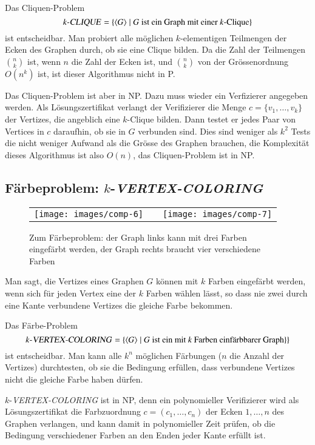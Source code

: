 Das Cliquen-Problem
\[
\text{$k$-\textsl{CLIQUE}} = \{ \langle G\rangle\;|\;
\text{$G$ ist ein Graph mit einer $k$-Clique}\}
\]
ist entscheidbar.
Man probiert alle möglichen $k$-elementigen
Teilmengen der Ecken des Graphen durch, ob sie eine Clique
bilden.
Da die Zahl der Teilmengen $\binom{n}{k}$ ist, wenn $n$
die Zahl der Ecken ist, und $\binom{n}{k}$ von der Grössenordnung
$O(n^k)$ ist, ist dieser Algorithmus nicht in P.

Das Cliquen-Problem ist aber in NP.
Dazu muss wieder ein Verfizierer angegeben werden.
Als Lösungszertifikat verlangt
der Verifizierer die Menge $c=\{v_1,\dots,v_k\}$ der
Vertizes, die angeblich eine $k$-Clique bilden.
Dann testet er jedes Paar von Vertices in $c$ daraufhin, ob sie in $G$
verbunden sind.
Dies sind weniger als $k^2$ Tests die nicht
weniger Aufwand als die Grösse des Graphen brauchen, die
Komplexität dieses Algorithmus ist also $O(n)$, das
Cliquen-Problem ist in NP.

\subsection{Färbeproblem: \texorpdfstring{$k$}{k}-\textsl{VERTEX-COLORING}}
%
\begin{figure}
\begin{center}
\begin{tabular}{ccc}
\texttt{[image: images/comp-6]}&
\qquad&\qquad
\texttt{[image: images/comp-7]}
\end{tabular}
\end{center}
\caption{Zum Färbeproblem: der Graph links kann mit drei Farben
eingefärbt werden, der Graph rechts braucht vier verschiedene Farben
\label{vertex-coloring-examples}}
\end{figure}%
%
Man sagt, die Vertizes eines Graphen $G$ können mit $k$ Farben
eingefärbt werden, wenn sich für jeden Vertex eine der $k$ Farben
wählen lässt, so dass nie zwei durch eine Kante verbundene Vertizes
die gleiche Farbe bekommen.

Das Färbe-Problem 
\[
\text{$k$-\textsl{VERTEX-COLORING}}
=
\{
\langle G\rangle\;|\;
\text{$G$ ist ein mit $k$ Farben einfärbbarer Graph}\}
\}
\]
ist entscheidbar.
Man kann alle $k^n$ möglichen Färbungen
($n$ die Anzahl der Vertizes) durchtesten, ob sie die Bedingung
erfüllen, dass verbundene Vertizes nicht die gleiche Farbe haben
dürfen.

$k$-\textsl{VERTEX-COLORING} ist in NP, denn ein polynomieller Verifizierer
wird als Lösungszertifikat die Farbzuordnung $c=(c_1,\dots,c_n)$ der
Ecken $1,\dots,n$ des Graphen verlangen, und kann damit in polynomieller
Zeit prüfen, ob die Bedingung verschiedener Farben an den Enden
jeder Kante erfüllt ist.

